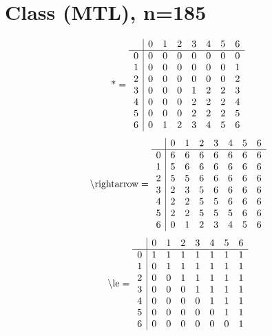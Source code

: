 \documentclass[11pt]{article}
\begin{document}
\section{Class (MTL), n=185}
\[\text{*} = 
\begin{array}{r | r r r r r r r}
 & 0 & 1 & 2 & 3 & 4 & 5 & 6 \\ \hline
0 & 0 & 0 & 0 & 0 & 0 & 0 & 0 \\
1 & 0 & 0 & 0 & 0 & 0 & 0 & 1 \\
2 & 0 & 0 & 0 & 0 & 0 & 0 & 2 \\
3 & 0 & 0 & 0 & 1 & 2 & 2 & 3 \\
4 & 0 & 0 & 0 & 2 & 2 & 2 & 4 \\
5 & 0 & 0 & 0 & 2 & 2 & 2 & 5 \\
6 & 0 & 1 & 2 & 3 & 4 & 5 & 6 \\
\end{array}
\]
\[\text{\textbackslash rightarrow} = 
\begin{array}{r | r r r r r r r}
 & 0 & 1 & 2 & 3 & 4 & 5 & 6 \\ \hline
0 & 6 & 6 & 6 & 6 & 6 & 6 & 6 \\
1 & 5 & 6 & 6 & 6 & 6 & 6 & 6 \\
2 & 5 & 5 & 6 & 6 & 6 & 6 & 6 \\
3 & 2 & 3 & 5 & 6 & 6 & 6 & 6 \\
4 & 2 & 2 & 5 & 5 & 6 & 6 & 6 \\
5 & 2 & 2 & 5 & 5 & 5 & 6 & 6 \\
6 & 0 & 1 & 2 & 3 & 4 & 5 & 6 \\
\end{array}
\]
\[\text{\textbackslash le} = 
\begin{array}{r | r r r r r r r}
 & 0 & 1 & 2 & 3 & 4 & 5 & 6 \\ \hline
0 & 1 & 1 & 1 & 1 & 1 & 1 & 1 \\
1 & 0 & 1 & 1 & 1 & 1 & 1 & 1 \\
2 & 0 & 0 & 1 & 1 & 1 & 1 & 1 \\
3 & 0 & 0 & 0 & 1 & 1 & 1 & 1 \\
4 & 0 & 0 & 0 & 0 & 1 & 1 & 1 \\
5 & 0 & 0 & 0 & 0 & 0 & 1 & 1 \\
6 & 0 & 0 & 0 & 0 & 0 & 0 & 1 \\
\end{array}
\]
\end{document}

